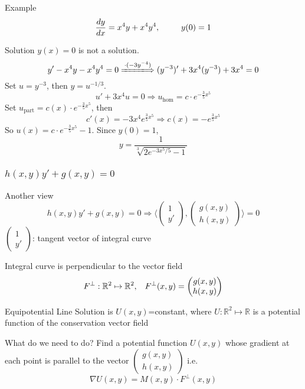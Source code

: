 \documentclass{beamer}
\begin{document}
\begin{frame}
\begin{block}{Example}
$$\dfrac{dy}{dx}=x^4y+x^4y^4, \hspace{9mm}y(0)=1$$
\end{block}
\end{frame}

\begin{frame}
\begin{block}{Solution}
$y(x)=0$ is not a solution.
$$y'-x^4y-x^4y^4=0\xLongrightarrow{\cdot (-3y^{-4})}(y^{-3})'+3x^4(y^{-3})+3x^4=0$$
Set $u=y^{-3}$, then $y=u^{-1/3}$.
$$u'+3x^4u=0\Rightarrow u_{\text{hom}}=c\cdot e^{-\frac{3}{5}x^5}$$
Set $u_{\text{part}}=c(x)\cdot e^{-\frac{3}{5}x^5}$, then 
$$c'(x)=-3x^4e^{\frac{3}{5}x^5}\Rightarrow c(x)=-e^{\frac{3}{5}x^5}$$
So $u(x)=c\cdot e^{-\frac{3}{5}x^5}-1$. Since $y(0)=1$, 
$$y=\dfrac{1}{\sqrt[3]{2e^{-3x^5/5}-1}}$$
\end{block}
\end{frame}

\begin{frame}
\frametitle{$h(x,y)y'+g(x,y)=0$}
\begin{block}{Another view}
$$h(x,y)y'+g(x,y)=0\Rightarrow\langle\begin{pmatrix}
1\\
y'
\end{pmatrix},\begin{pmatrix}
g(x,y)\\
h(x,y)
\end{pmatrix}\rangle=0$$
$\begin{pmatrix}
1\\
y'
\end{pmatrix}$: tangent vector of integral curve

\end{block}
\begin{block}{}
Integral curve is perpendicular to the vector field
$$F^{\perp}:\mathbb{R}^2\mapsto\mathbb{R}^2,\hspace{3mm}F^{\perp}(x,y)=\begin{pmatrix}
g(x,y)\\
h(x,y)
\end{pmatrix} $$
\end{block}
\end{frame}

\begin{frame}
\begin{block}{Equipotential Line}
Solution is $U(x,y)$=constant, where $U:\mathbb{R}^2\mapsto\mathbb{R}$ is a potential function of the conservation vector field

\end{block}
\begin{block}{What do we need to do?}
Find a potential function $U(x,y)$ whose gradient at each point is parallel to the vector $\begin{pmatrix}
g(x,y)\\h(x,y)
\end{pmatrix}$ i.e.
$$\nabla U(x,y)=M(x,y)\cdot F^{\perp}(x,y)$$
\end{block}
\end{frame}
\end{document}
